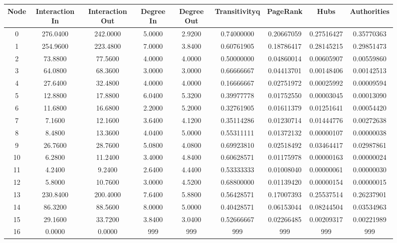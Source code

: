 \documentclass[12pt,a4paper]{thesis}
\begin{document}
\begin{figure}[H]
\centering
\tiny
\begin{tabular}{|c|c|c|c|c|c|c|c|c|}
\hline	Node	&	Interaction In	&	Interaction Out	&	Degree In	&	Degree Out	&	Transitivityq	&	PageRank	&	Hubs	&	Authorities	\\
\hline	0	&	276.0400	&	242.0000	&	5.0000	&	2.9200	&	0.74000000	&	0.20667059	&	0.27516427	&	0.35770363	\\
\hline	1	&	254.9600	&	223.4800	&	7.0000	&	3.8400	&	0.60761905	&	0.18786417	&	0.28145215	&	0.29851473	\\
\hline	2	&	73.8800	&	77.5600	&	4.0000	&	4.0000	&	0.50000000	&	0.04860014	&	0.00605907	&	0.00559860	\\
\hline	3	&	64.0800	&	68.3600	&	3.0000	&	3.0000	&	0.66666667	&	0.04413701	&	0.00148406	&	0.00142513	\\
\hline	4	&	27.6400	&	32.4800	&	4.0000	&	4.0000	&	0.16666667	&	0.02751972	&	0.00025992	&	0.00009594	\\
\hline	5	&	12.8800	&	17.8800	&	6.0400	&	5.3200	&	0.39977778	&	0.01752550	&	0.00003045	&	0.00013090	\\
\hline	6	&	11.6800	&	16.6800	&	2.2000	&	5.2000	&	0.32761905	&	0.01611379	&	0.01251641	&	0.00054420	\\
\hline	7	&	7.1600	&	12.1600	&	3.6400	&	4.1200	&	0.35114286	&	0.01230714	&	0.01444776	&	0.00272638	\\
\hline	8	&	8.4800	&	13.3600	&	4.0400	&	5.0000	&	0.55311111	&	0.01372132	&	0.00000107	&	0.00000038	\\
\hline	9	&	26.7600	&	28.7600	&	5.0800	&	4.0800	&	0.69923810	&	0.02518492	&	0.03464417	&	0.02987861	\\
\hline	10	&	6.2800	&	11.2400	&	3.4000	&	4.8400	&	0.60628571	&	0.01175978	&	0.00000163	&	0.00000024	\\
\hline	11	&	4.2400	&	9.2400	&	2.6400	&	4.4400	&	0.53333333	&	0.01008040	&	0.00000061	&	0.00000030	\\
\hline	12	&	5.8000	&	10.7600	&	3.0000	&	4.5200	&	0.68800000	&	0.01139420	&	0.00000154	&	0.00000015	\\
\hline	13	&	230.8400	&	200.4000	&	7.6400	&	5.8800	&	0.56428571	&	0.17007393	&	0.25537514	&	0.26237901	\\
\hline	14	&	86.3200	&	88.5600	&	8.0000	&	5.0000	&	0.40428571	&	0.06153044	&	0.08244504	&	0.03534963	\\
\hline	15	&	29.1600	&	33.7200	&	3.8400	&	3.0400	&	0.52666667	&	0.02266485	&	0.00209317	&	0.00221989	\\
\hline	16	&	0.0000	&	0.0000	&	999	&	999	&	999	&	999	&	999	&	999	\\

\end{tabular}
\end{figure}
\end{document}
